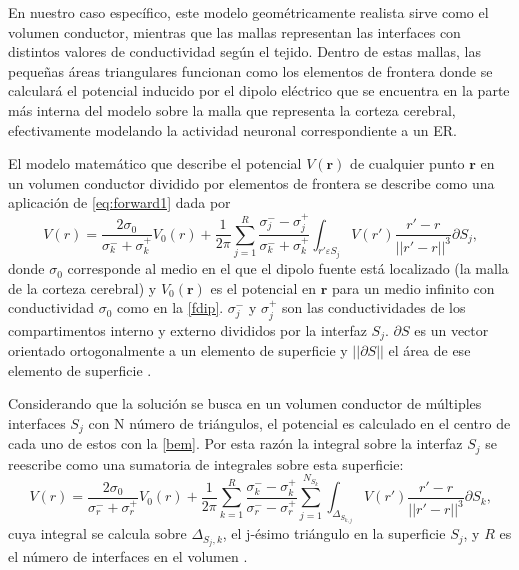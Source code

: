 En nuestro caso específico, este modelo geométricamente realista sirve como el volumen conductor, mientras que las mallas representan las interfaces con distintos valores de conductividad según el tejido. 
Dentro de estas mallas, las pequeñas áreas triangulares funcionan como los elementos de frontera donde se calculará el potencial inducido por el dipolo eléctrico que se encuentra en la parte más interna del modelo sobre la malla que representa la corteza cerebral, efectivamente modelando la actividad neuronal correspondiente a un ER.

El modelo matemático que describe el potencial $V(\mathbf{r})$ de cualquier punto $\mathbf{r}$ en un volumen conductor dividido por elementos de frontera se describe como una aplicación de \cref{eq:forward1} dada por
\begin{equation}
	\label{bem}
	V(r) = \frac{2\sigma_{0}}{\sigma_{k}^{-} + {\sigma_{k}^{+}}} V_{0}(r) + \frac{1}{2\pi} \sum_{j=1}^{R}\frac{\sigma_{j}^{-}-\sigma_{j}^{+}}{\sigma_{k}^{-}+\sigma_{k}^{+}} \int_{r'\varepsilon S_{j}} V(r') \frac{r'-r}{||r'-r||^3}\partial S_{j}\text{,}
\end{equation}
donde $\sigma_{0}$ corresponde al medio en el que el dipolo fuente está localizado (la malla de la corteza cerebral) y $V_{0}(\mathbf{r})$ es el potencial en $\mathbf{r}$ para un medio infinito con conductividad $\sigma_{0}$ como en la \cref{fdip}. 
$\sigma_{j}^{-}$ y $\sigma_{j}^{+}$ son las conductividades de los compartimentos interno y externo divididos por la interfaz $S_{j}$. $\partial S$ es un vector orientado ortogonalmente a un elemento de superficie y $||\partial S||$ el área de ese elemento de superficie \cite{Hallez2007}.

Considerando que la solución se busca en un volumen conductor de múltiples interfaces $S_{j}$ con N número de triángulos, el potencial es calculado en el centro de cada uno de estos con la \cref{bem}. 
Por esta razón la integral sobre la interfaz $S_{j}$ se reescribe como una sumatoria de integrales sobre esta superficie:
\begin{equation}
	\label{bem2}
	V(r) = \frac{2\sigma_{0}}{\sigma_{r}^{-} + {\sigma_{r}^{+}}} V_{0}(r) + \frac{1}{2\pi} \sum_{k=1}^{R}\frac{\sigma_{k}^{-}-\sigma_{k}^{+}}{\sigma_{r}^{-}-\sigma_{r}^{+}} \sum_{j=1}^{N_{S_{k}}} \int_{\Delta_{S_{k,j}}} V(r') \frac{r'-r}{||r'-r||^3}\partial S_{k}\text{,}
\end{equation}
cuya integral se calcula sobre $\Delta_{S_{j},k}$, el j-ésimo triángulo en la superficie $S_{j}$, y $R$ es el número de interfaces en el volumen \cite{Hallez2007}.

